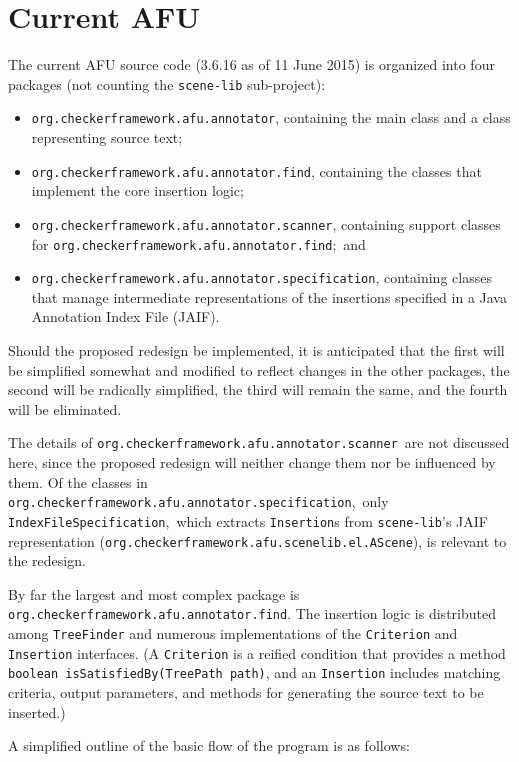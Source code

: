 \documentclass{article}
\begin{document}
\section{Current AFU}

The current AFU source code (3.6.16 as of 11 June 2015) is organized
into four packages (not counting the
\texttt{scene-lib} sub-project):
\begin{itemize}
\item  \texttt{org.checkerframework.afu.annotator}, containing the main class and a class
representing source text;
\item  \texttt{org.checkerframework.afu.annotator.find}, containing the classes that implement
the core insertion logic;
\item  \texttt{org.checkerframework.afu.annotator.scanner}, containing support classes for
\texttt{org.checkerframework.afu.annotator.find};\ and
\item  \texttt{org.checkerframework.afu.annotator.specification}, containing classes that
manage intermediate representations of the insertions specified in a
Java Annotation Index File (JAIF).
\end{itemize}
Should the proposed redesign be implemented, it is anticipated that the
first will be simplified somewhat and modified to reflect changes in the
other packages, the second will be radically simplified, the third will
remain the same, and the fourth will be eliminated.

The details of \texttt{org.checkerframework.afu.annotator.scanner}\ are not discussed here, since
the proposed redesign will neither change them nor be influenced by
them.  Of the classes in \texttt{org.checkerframework.afu.annotator.specification},\ only
\texttt{IndexFileSpecification},\ which extracts \texttt{Insertion}s
from \texttt{scene-lib}'s JAIF representation
(\texttt{org.checkerframework.afu.scenelib.el.AScene}), is relevant to the redesign.

By far the largest and most complex package is \texttt{org.checkerframework.afu.annotator.find}.
The insertion logic is distributed among \texttt{TreeFinder} and
numerous implementations of the \texttt{Criterion} and
\texttt{Insertion} interfaces.  (A \texttt{Criterion} is a reified
condition that provides a method
\texttt{boolean isSatisfiedBy(TreePath path)},
and an \texttt{Insertion} includes matching criteria, output parameters,
and methods for generating the source text to be inserted.)

A simplified outline of the basic flow of the program is as follows:
\end{document}
